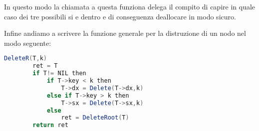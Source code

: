 In questo modo la chiamata a questa funziona delega il compito di capire in quale caso dei tre possibili si e dentro e di conseguenza deallocare in modo sicuro.

Infine andiamo a scrivere la funzione generale per la distruzione di un nodo nel modo seguente:

\begin{lstlisting}[language=Java]
	DeleteR(T,k)
		ret = T
		if T!= NIL then
			if T->key < k then
				T->dx = Delete(T->dx,k)
			else if T->key > k then
				T->sx = Delete(T->sx,k)
			else
				ret = DeleteRoot(T)
		return ret
\end{lstlisting}


